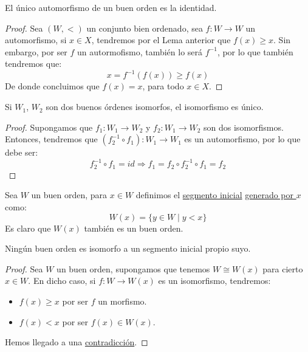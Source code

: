 \begin{coro}
    El único automorfismo de un buen orden es la identidad.
    \begin{proof}
        Sea $(W,<)$ un conjunto bien ordenado, sea $f:W\to W$ un automorfismo, si $x\in X$, tendremos por el Lema anterior que $f(x) \geq x$. Sin embargo, por ser $f$ un autormofismo, también lo será $f^{-1}$, por lo que también tendremos que:
        \begin{equation*}
            x = f^{-1}(f(x)) \geq f(x)
        \end{equation*}
        De donde concluimos que $f(x) = x$, para todo $x\in X$.
    \end{proof}
\end{coro}

\begin{coro}
    Si $W_1$, $W_2$ son dos buenos órdenes isomorfos, el isomorfismo es único.
    \begin{proof}
        Supongamos que $f_1:W_1\to W_2$ y $f_2:W_1\to W_2$ son dos isomorfismos. Entonces, tendremos que $(f_2^{-1}\circ f_1):W_1\to W_1$ es un automorfismo, por lo que debe ser:
        \begin{equation*}
            f_2^{-1} \circ f_1 = id \Longrightarrow f_1 = f_2 \circ f_2^{-1} \circ f_1 = f_2
        \end{equation*}
    \end{proof}
\end{coro}

\begin{definicion}
Sea $W$ un buen orden, para $x\in W$ definimos el \underline{segmento inicial} \underline{generado por $x$} como:
    \begin{equation*}
        W(x) = \{y\in W \mid y < x\}
    \end{equation*}
    Es claro que $W(x)$ también es un buen orden.
\end{definicion}

\begin{lema}
    Ningún buen orden es isomorfo a un segmento inicial propio suyo.
    \begin{proof}
        Sea $W$ un buen orden, supongamos que tenemos $W\cong W(x)$ para cierto $x\in W$. En dicho caso, si $f:W\to W(x)$ es un isomorfismo, tendremos:
        \begin{itemize}
            \item $f(x)\geq x$ por ser $f$ un morfismo.
            \item $f(x) < x$ por ser $f(x) \in W(x)$.
        \end{itemize}
        Hemos llegado a una \underline{contradicción}.
    \end{proof}
\end{lema}

